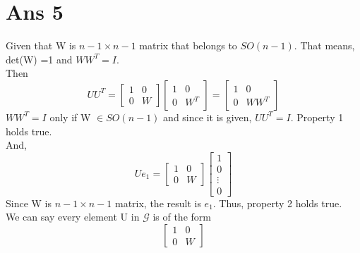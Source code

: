 \documentclass[10pt]{article}
\begin{document}
\section*{Ans 5}
\begin{flushleft}
Given that W is $n-1 \times n-1$ matrix that belongs to $SO(n-1)$. That means, det(W) =1 and $WW^{T}=I$. \\
\vspace{0.5em}
Then $$
U U^{T}=  
\begin{bmatrix}
    1 & 0 \\
    0 & W
\end{bmatrix} 
\begin{bmatrix}
    1 & 0 \\
    0 & W^{T}
\end{bmatrix}
= \begin{bmatrix}
    1 & 0 \\
    0 & WW^{T}
\end{bmatrix}
$$
$WW^{T} = I$ only if W $\in SO(n-1)$ and since it is given, $UU^{T}= I$. Property 1 holds true.\\
\vspace{0.5em}
And, \\
\vspace{0.5em}
$$
U e_{1} = 
\begin{bmatrix}
    1 & 0 \\
    0 & W
\end{bmatrix} 
\begin{bmatrix} 
1 \\
0 \\
\vdots \\
0 
\end{bmatrix} 
$$
Since W is $n-1 \times n-1$ matrix, the result is $e_{1}$. Thus, property 2 holds true.\\
\vspace{0.5em}
We can say every element U in $\mathcal{G}$ is of the form
$$
\begin{bmatrix}
    1 & 0 \\
    0 & W
\end{bmatrix} 
$$
\end{flushleft}
\end{document}
